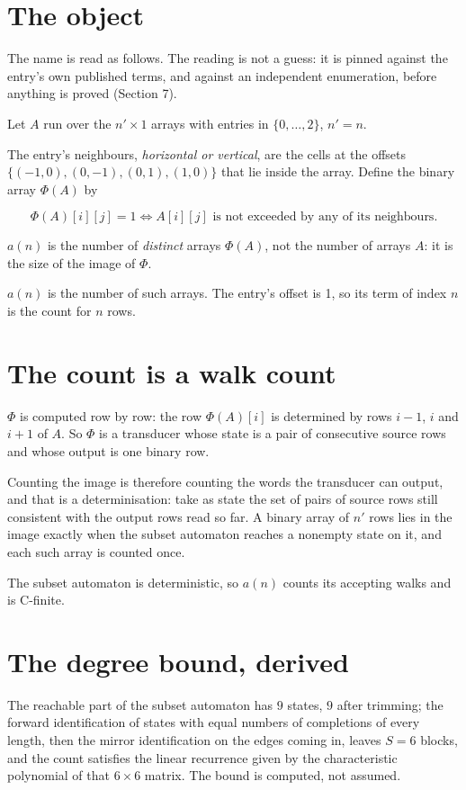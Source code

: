 \documentclass[11pt]{article}
\theoremstyle{definition}
\begin{document}
\section{The object}

The name is read as follows. The reading is not a guess: it is pinned against the entry's own published terms, and against an independent enumeration, before anything is proved (Section 7).

Let $A$ run over the $n' \times 1$ arrays with entries in $\{0,\dots,2\}$, $n' = n$.

The entry's neighbours, {\itshape horizontal or vertical}, are the cells at the offsets $\{(-1,0), (0,-1), (0,1), (1,0)\}$ that lie inside the array. Define the binary array $\Phi(A)$ by

\[\Phi(A)[i][j] = 1 \iff A[i][j] \text{ is not exceeded by any of its neighbours}.\]

$a(n)$ is the number of {\itshape distinct} arrays $\Phi(A)$, not the number of arrays $A$: it is the size of the image of $\Phi$.

$a(n)$ is the number of such arrays. The entry's offset is 1, so its term of index $n$ is the count for $n$ rows.

\section{The count is a walk count}

$\Phi$ is computed row by row: the row $\Phi(A)[i]$ is determined by rows $i-1$, $i$ and $i+1$ of $A$. So $\Phi$ is a transducer whose state is a pair of consecutive source rows and whose output is one binary row.

Counting the image is therefore counting the words the transducer can output, and that is a determinisation: take as state the set of pairs of source rows still consistent with the output rows read so far. A binary array of $n'$ rows lies in the image exactly when the subset automaton reaches a nonempty state on it, and each such array is counted once.

The subset automaton is deterministic, so $a(n)$ counts its accepting walks and is C-finite.

\section{The degree bound, derived}

The reachable part of the subset automaton has $9$ states, $9$ after trimming; the forward identification of states with equal numbers of completions of every length, then the mirror identification on the edges coming in, leaves $S = 6$ blocks, and the count satisfies the linear recurrence given by the characteristic polynomial of that $6\times6$ matrix. The bound is computed, not assumed.
\end{document}
